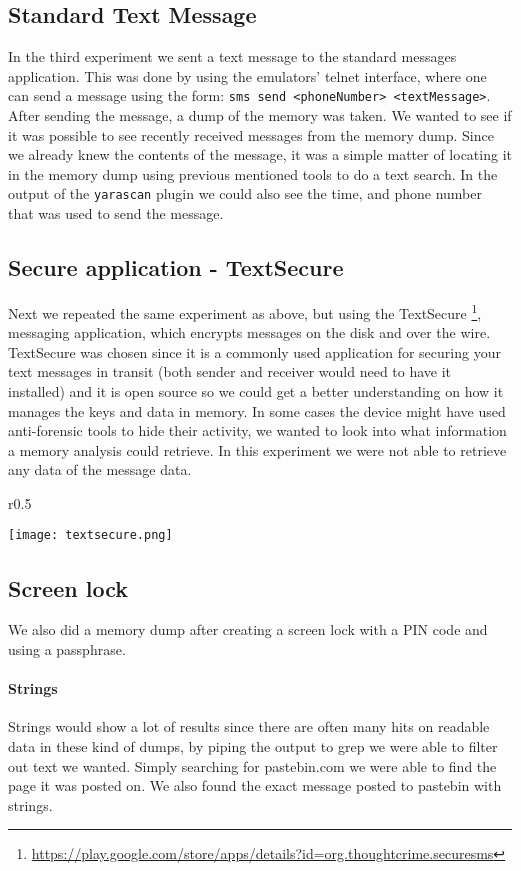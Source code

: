 \subsection{Standard Text Message}
In the third experiment we sent a text message to the standard messages application.
This was done by using the emulators’ telnet interface, where one can send a message
using the form: \texttt{sms send <phoneNumber> <textMessage>}. After sending the
message, a dump of the memory was taken. We wanted to see if it was possible to 
see recently received messages from the memory dump. Since we already knew the 
contents of the message, it was a simple matter of locating it in the memory 
dump using previous mentioned tools to do a text search. In the output of the
\texttt{yarascan} plugin we could also see the time, and phone number that was
used to send the message.
  
\subsection{Secure application - TextSecure}
Next we repeated the same experiment as above, but using the TextSecure
\footnote{\url{https://play.google.com/store/apps/details?id=org.thoughtcrime.securesms}}, 
messaging application, which encrypts messages on the disk and over the wire.
TextSecure was chosen since it is a commonly used application for securing your 
text messages in transit (both sender and receiver would need to have it 
installed) and it is open source so we could get a better understanding on 
how it manages the keys and data in memory.  
In some cases the device might have used anti-forensic tools to hide their 
activity, we wanted to look into what information a memory analysis could 
retrieve. In this experiment we were not able to retrieve any data of the message 
data.
\begin{wrapfigure}{r}{0.5\textwidth}
    \begin{center}
        \texttt{[image: textsecure.png]}
    \end{center}
\end{wrapfigure}

\subsection{Screen lock}
We also did a memory dump after creating a screen lock with a PIN code and using a passphrase.
  \paragraph{Strings}
  Strings would show a lot of results since there are often many hits on readable 
  data in these kind of dumps, by piping the output to grep we were able to 
  filter out text we wanted. Simply searching for pastebin.com we were able to 
  find the page it was posted on. We also found the exact message posted to pastebin with strings.

